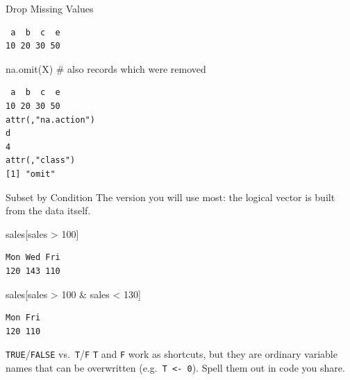\documentclass[
  ignorenonframetext,
  aspectratio=169,
]{beamer}
\newenvironment{Shaded}{\begin{snugshade}}{\end{snugshade}}
\newcommand{\CommentTok}[1]{\textcolor[rgb]{0.37,0.37,0.37}{#1}}
\newcommand{\DecValTok}[1]{\textcolor[rgb]{0.68,0.00,0.00}{#1}}
\newcommand{\FunctionTok}[1]{\textcolor[rgb]{0.28,0.35,0.67}{#1}}
\newcommand{\NormalTok}[1]{\textcolor[rgb]{0.00,0.23,0.31}{#1}}
\newcommand{\SpecialCharTok}[1]{\textcolor[rgb]{0.37,0.37,0.37}{#1}}
\begin{document}
\begin{frame}[fragile]{Drop Missing Values}
\begingroup\tiny\color{darkgray}

\begin{verbatim}
 a  b  c  e 
10 20 30 50 
\end{verbatim}

\endgroup

\begin{Shaded}
\begin{Highlighting}[]
\FunctionTok{na.omit}\NormalTok{(X)                   }\CommentTok{\# also records which were removed}
\end{Highlighting}
\end{Shaded}

\begingroup\tiny\color{darkgray}

\begin{verbatim}
 a  b  c  e 
10 20 30 50 
attr(,"na.action")
d 
4 
attr(,"class")
[1] "omit"
\end{verbatim}

\endgroup
\end{frame}

\begin{frame}[fragile]{Subset by Condition}
\protect\hypertarget{subset-by-condition}{}
The version you will use most: the logical vector is built from the data
itself.

\begin{Shaded}
\begin{Highlighting}[]
\NormalTok{sales[sales }\SpecialCharTok{\textgreater{}} \DecValTok{100}\NormalTok{]}
\end{Highlighting}
\end{Shaded}

\begingroup\tiny\color{darkgray}

\begin{verbatim}
Mon Wed Fri 
120 143 110 
\end{verbatim}

\endgroup

\begin{Shaded}
\begin{Highlighting}[]
\NormalTok{sales[sales }\SpecialCharTok{\textgreater{}} \DecValTok{100} \SpecialCharTok{\&}\NormalTok{ sales }\SpecialCharTok{\textless{}} \DecValTok{130}\NormalTok{]}
\end{Highlighting}
\end{Shaded}

\begingroup\tiny\color{darkgray}

\begin{verbatim}
Mon Fri 
120 110 
\end{verbatim}

\endgroup

\begin{exampleblock}{\texttt{TRUE}/\texttt{FALSE}
vs.~\texttt{T}/\texttt{F}}
\protect\hypertarget{truefalse-vs.-tf}{}
\texttt{T} and \texttt{F} work as shortcuts, but they are ordinary
variable names that can be overwritten
(e.g.~\texttt{T\ \textless{}-\ 0}). Spell them out in code you share.
\end{exampleblock}
\end{frame}
\end{document}
